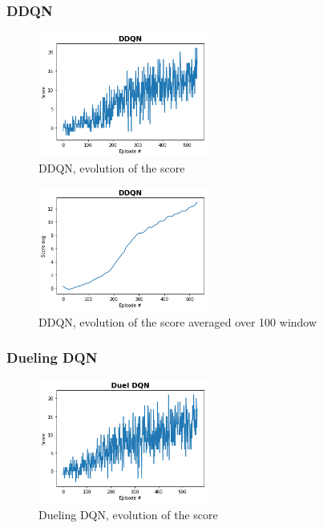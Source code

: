 \documentclass[12pt]{article}
\begin{document}
\subsubsection{DDQN}

\begin{figure}[!htbp]
 \centering
  \includegraphics[width=0.5\textwidth]{../PNG/ddqn.png}
  \caption{DDQN, evolution of the score}
  \label{fig:DDQN}
\end{figure}

\begin{figure}[!htbp]
 \centering
  \includegraphics[width=0.5\textwidth]{../PNG/ddqn_smooth.png}
  \caption{DDQN, evolution of the score averaged over 100 window}
  \label{fig:DDQN_av}
\end{figure}

\subsubsection{Dueling DQN}

\begin{figure}[!htbp]
 \centering
  \includegraphics[width=0.5\textwidth]{../PNG/duel_dqn.png}
  \caption{Dueling DQN, evolution of the score}
  \label{fig:Duel_DQN}
\end{figure}
\end{document}
